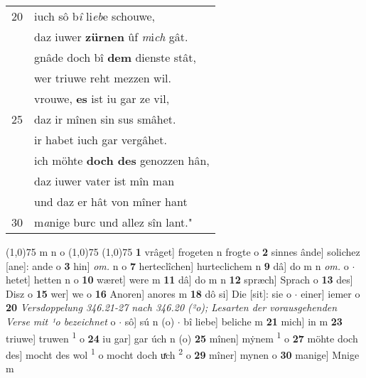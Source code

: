 \documentclass[8pt,a4paper,notitlepage]{article}
\begin{document}
\begin{table}[ht]
\begin{minipage}[t]{0.5\linewidth}
\begin{tabular}{rl}
20 & iuch sô b\textit{î} li\textit{eb}e schouwe,\\ 
 & daz iuwer \textbf{zürnen} ûf \textit{m}i\textit{ch} gât.\\ 
 & gnâde doch bî \textbf{dem} dienste stât,\\ 
 & wer triuwe reht mezzen wil.\\ 
 & vrouwe, \textbf{es} ist iu gar ze vil,\\ 
25 & daz ir mînen sin sus smâhet.\\ 
 & ir habet iuch gar vergâhet.\\ 
 & ich möhte \textbf{doch des} genozzen hân,\\ 
 & daz iuwer vater ist mîn man\\ 
 & und daz er hât von mîner hant\\ 
30 & m\textit{a}nige burc und allez sîn lant."\\ 
\end{tabular}
\scriptsize
\line(1,0){75} \newline
m n o \newline
\line(1,0){75} \newline
\newline
\line(1,0){75} \newline
\textbf{1} vrâget] frogeten n frogte o \textbf{2} sinnes ânde] solichez [ane]: ande o \textbf{3} hin] \textit{om.} n o \textbf{7} herteclîchen] hurteclichem n \textbf{9} dâ] do m n \textit{om.} o  $\cdot$ hetet] hetten n o \textbf{10} wæret] were m \textbf{11} dâ] do m n \textbf{12} spræch] Sprach o \textbf{13} des] Disz o \textbf{15} wer] we o \textbf{16} Anoren] anores m \textbf{18} dô si] Die [sit]: sie o  $\cdot$ einer] iemer o \textbf{20} \textit{Versdoppelung 346.21-27 nach 346.20 (²o); Lesarten der vorausgehenden Verse mit ¹o bezeichnet} o   $\cdot$ sô] sú n (o)  $\cdot$ bî liebe] beliche m \textbf{21} mich] in m \textbf{23} triuwe] truwen \textsuperscript{1}\hspace{-1.3mm} o \textbf{24} iu gar] gar úch n (o) \textbf{25} mînen] mẏnem \textsuperscript{1}\hspace{-1.3mm} o \textbf{27} möhte doch des] mocht des wol \textsuperscript{1}\hspace{-1.3mm} o mocht doch uͯch \textsuperscript{2}\hspace{-1.3mm} o \textbf{29} mîner] mynen o \textbf{30} manige] Mnige m \newline
\end{minipage}
\end{table}
\newpage
\end{document}
